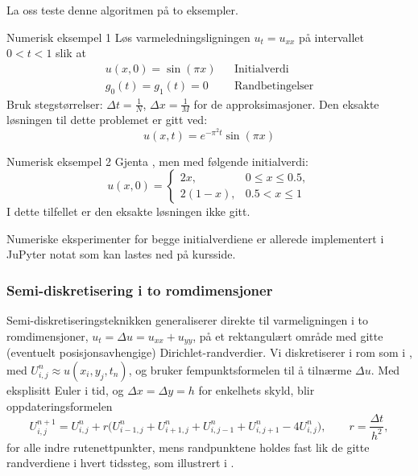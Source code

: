 La oss teste denne algoritmen på to eksempler.

\begin{eks}{Numerisk eksempel 1}
\label{ex:numex1}
Løs varmeledningsligningen \( u_t = u_{xx} \) på intervallet \( 0 < t < 1 \) slik at
\begin{align*}
 u(x, 0) = \sin(\pi x) && \text{Initialverdi}\\
 g_0(t) = g_1(t) = 0  && \text{Randbetingelser}
 \end{align*}
 Bruk stegstørrelser: \( \Delta t = \frac{1}{N} \), \( \Delta x = \frac{1}{M} \) for de approksimasjoner. 
Den eksakte løsningen til dette problemet er gitt ved:
\[
u(x, t) = e^{-\pi^2 t} \sin(\pi x)
\]
\end{eks}
\begin{eks}{Numerisk eksempel 2}
Gjenta , men med følgende initialverdi:
\[
u(x, 0) =
\begin{cases}
2x, & 0 \leq x \leq 0.5, \\
2(1 - x), & 0.5 < x \leq 1
\end{cases}
\]
I dette tilfellet er den eksakte løsningen ikke gitt.
\end{eks}
Numeriske eksperimenter for begge initialverdiene er allerede implementert i JuPyter notat som kan lastes ned på kursside.

\subsubsection*{Semi-diskretisering i to romdimensjoner}
Semi-diskretiseringsteknikken generaliserer direkte til varmeligningen i to romdimensjoner, $u_t = \Delta u = u_{xx}+u_{yy}$, på et rektangulært område med gitte (eventuelt posisjonsavhengige) Dirichlet-randverdier. Vi diskretiserer i rom som i , med $U_{i,j}^n\approx u(x_i,y_j,t_n)$, og bruker fempunktsformelen til å tilnærme $\Delta u$. Med eksplisitt Euler i tid, og $\Delta x=\Delta y=h$ for enkelhets skyld, blir oppdateringsformelen
\begin{equation}\label{heat2d_explicit}
U_{i,j}^{n+1} = U_{i,j}^n + r\Big(U_{i-1,j}^n+U_{i+1,j}^n+U_{i,j-1}^n+U_{i,j+1}^n - 4U_{i,j}^n\Big), \qquad r=\frac{\Delta t}{h^2},
\end{equation}
for alle indre rutenettpunkter, mens randpunktene holdes fast lik de gitte randverdiene i hvert tidssteg, som illustrert i .

